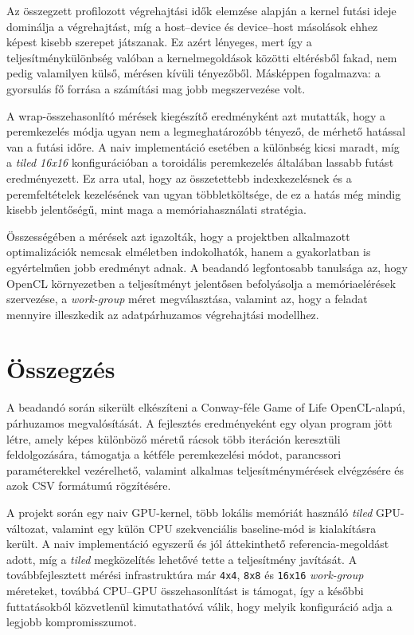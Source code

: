 \documentclass[12pt,a4paper]{article}
\begin{document}
Az összegzett profilozott végrehajtási idők elemzése alapján a kernel futási ideje dominálja a végrehajtást, míg a host--device és device--host másolások ehhez képest kisebb szerepet játszanak. Ez azért lényeges, mert így a teljesítménykülönbség valóban a kernelmegoldások közötti eltérésből fakad, nem pedig valamilyen külső, mérésen kívüli tényezőből. Másképpen fogalmazva: a gyorsulás fő forrása a számítási mag jobb megszervezése volt.

A wrap-összehasonlító mérések kiegészítő eredményként azt mutatták, hogy a peremkezelés módja ugyan nem a legmeghatározóbb tényező, de mérhető hatással van a futási időre. A naiv implementáció esetében a különbség kicsi maradt, míg a \emph{tiled 16x16} konfigurációban a toroidális peremkezelés általában lassabb futást eredményezett. Ez arra utal, hogy az összetettebb indexkezelésnek és a peremfeltételek kezelésének van ugyan többletköltsége, de ez a hatás még mindig kisebb jelentőségű, mint maga a memóriahasználati stratégia.

Összességében a mérések azt igazolták, hogy a projektben alkalmazott optimalizációk nemcsak elméletben indokolhatók, hanem a gyakorlatban is egyértelműen jobb eredményt adnak. A beadandó legfontosabb tanulsága az, hogy OpenCL környezetben a teljesítményt jelentősen befolyásolja a memóriaelérések szervezése, a \emph{work-group} méret megválasztása, valamint az, hogy a feladat mennyire illeszkedik az adatpárhuzamos végrehajtási modellhez.

\section{Összegzés}

A beadandó során sikerült elkészíteni a Conway-féle Game of Life OpenCL-alapú, párhuzamos megvalósítását. A fejlesztés eredményeként egy olyan program jött létre, amely képes különböző méretű rácsok több iteráción keresztüli feldolgozására, támogatja a kétféle peremkezelési módot, parancssori paraméterekkel vezérelhető, valamint alkalmas teljesítménymérések elvégzésére és azok CSV formátumú rögzítésére.

A projekt során egy naiv GPU-kernel, több lokális memóriát használó \emph{tiled} GPU-változat, valamint egy külön CPU szekvenciális baseline-mód is kialakításra került. A naiv implementáció egyszerű és jól áttekinthető referencia-megoldást adott, míg a \emph{tiled} megközelítés lehetővé tette a teljesítmény javítását. A továbbfejlesztett mérési infrastruktúra már \texttt{4x4}, \texttt{8x8} és \texttt{16x16} \emph{work-group} méreteket, továbbá CPU--GPU összehasonlítást is támogat, így a későbbi futtatásokból közvetlenül kimutathatóvá válik, hogy melyik konfiguráció adja a legjobb kompromisszumot.
\end{document}
